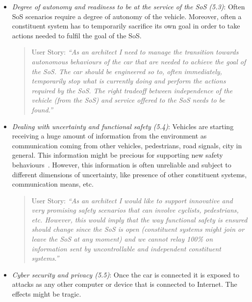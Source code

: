 \begin{itemize}
\begin{itemize}
\item {\em Degree of autonomy and readiness to be at the service of the SoS (5.3)}: Often SoS scenarios require a degree of autonomy of the vehicle. Moreover, often a constituent system has to temporarily sacrifice its own goal in order to take actions needed to fulfil the goal of the SoS.

\begin{quote}
{User Story:} 
\emph{``As an architect I need to manage the transition towards autonomous behaviours of the car that are needed to achieve the goal of the SoS. The car should be engineered so to, often immediately, temporarily stop what is currently doing and %
perform the actions required by the SoS. The right tradeoff between independence of the vehicle (from the SoS) and service offered to the SoS needs to be found.''}
\end{quote}

\item {\em Dealing with uncertainty and functional safety (5.4)}: Vehicles are starting receiving a huge amount of information from the environment as communication coming from other vehicles, pedestrians, road signals, city in general. This information might be precious for supporting new safety behaviours~\cite{VCC}. %
However, this information is often unreliable and subject to different dimensions of uncertainty, like presence of other constituent systems, communication means, etc.

\begin{quote}
{User Story:} 
\emph{``As an architect I would like to support innovative and very promising safety scenarios that can involve cyclists, pedestrians, etc. However, this would imply that the way functional safety is ensured should change since the SoS is open (constituent systems might join or leave the SoS at any moment) and we cannot relay 100\% on information sent by uncontrollable and independent constituent systems.''}
\end{quote}


\item {\em Cyber security and privacy (5.5)}: Once the car is connected it is exposed to attacks as any other computer or device that is connected to Internet. The effects might be tragic.


\end{itemize}
\end{itemize}
